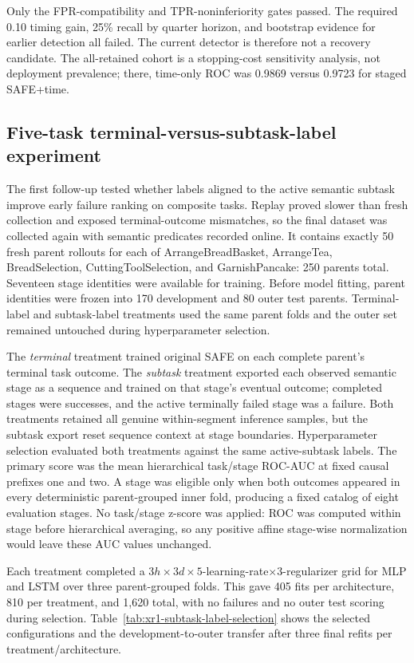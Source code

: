 \documentclass[11pt,a4paper]{article}
\begin{document}
Only the FPR-compatibility and TPR-noninferiority gates passed. The required
0.10 timing gain, 25\% recall by quarter horizon, and bootstrap evidence for
earlier detection all failed. The current detector is therefore not a recovery
candidate. The all-retained cohort is a stopping-cost sensitivity analysis,
not deployment prevalence; there, time-only ROC was 0.9869 versus 0.9723 for
staged SAFE+time.

\subsection{Five-task terminal-versus-subtask-label experiment}

The first follow-up tested whether labels aligned to the active semantic
subtask improve early failure ranking on composite tasks. Replay proved slower
than fresh collection and exposed terminal-outcome mismatches, so the final
dataset was collected again with semantic predicates recorded online. It
contains exactly 50 fresh parent rollouts for each of ArrangeBreadBasket,
ArrangeTea, BreadSelection, CuttingToolSelection, and GarnishPancake: 250
parents total. Seventeen stage identities were available for training. Before
model fitting, parent identities were frozen into 170 development and 80 outer
test parents. Terminal-label and subtask-label treatments used the same parent
folds and the outer set remained untouched during hyperparameter selection.

The \emph{terminal} treatment trained original SAFE on each complete parent's
terminal task outcome. The \emph{subtask} treatment exported each observed
semantic stage as a sequence and trained on that stage's eventual outcome;
completed stages were successes, and the active terminally failed stage was a
failure. Both treatments retained all genuine within-segment inference samples,
but the subtask export reset sequence context at stage boundaries. Hyperparameter
selection evaluated both treatments against the same active-subtask labels.
The primary score was the mean hierarchical task/stage ROC-AUC at fixed causal
prefixes one and two. A stage was eligible only when both outcomes appeared in
every deterministic parent-grouped inner fold, producing a fixed catalog of
eight evaluation stages. No task/stage z-score was applied: ROC was computed
within stage before hierarchical averaging, so any positive affine stage-wise
normalization would leave these AUC values unchanged.

Each treatment completed a $3h\times3d\times5$-learning-rate$\times3$-regularizer
grid for MLP and LSTM over three parent-grouped folds. This gave 405 fits per
architecture, 810 per treatment, and 1,620 total, with no failures and no outer
test scoring during selection. Table~\ref{tab:xr1-subtask-label-selection}
shows the selected configurations and the development-to-outer transfer after
three final refits per treatment/architecture.
\end{document}
